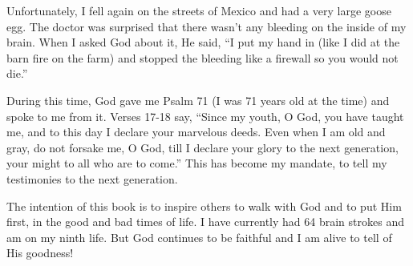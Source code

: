 \documentclass[twoside, 12pt]{book}
\begin{document}
Unfortunately, I fell again on the streets of Mexico and had a very large goose egg. The doctor was surprised that there wasn’t any bleeding on the inside of my brain. When I asked God about it, He said, “I put my hand in (like I did at the barn fire on the farm) and stopped the bleeding like a firewall so you would not die.”

During this time, God gave me Psalm 71 (I was 71 years old at the time) and spoke to me from it. Verses 17-18 say, “Since my youth, O God, you have taught me, and to this day I declare your marvelous deeds. Even when I am old and gray, do not forsake me, O God, till I declare your glory to the next generation, your might to all who are to come.” This has become my mandate, to tell my testimonies to the next generation.

The intention of this book is to inspire others to walk with God and to put Him first, in the good and bad times of life. I have currently had 64 brain strokes and am on my ninth life. But God continues to be faithful and I am alive to tell of His goodness!
\
\clearpage
\end{document}
